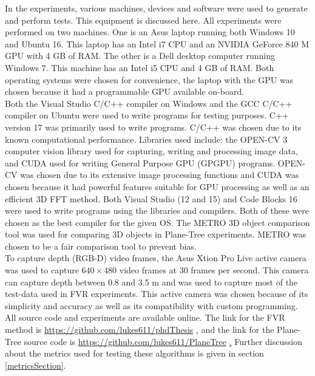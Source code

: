 
In the experiments, various machines, devices and software were used to generate and perform tests. This equipment is discussed here. All experiments were performed on two machines. One is an Asus laptop running both Windows 10 and Ubuntu 16. This laptop has an Intel i7 CPU and an NVIDIA GeForce 840 M GPU with 4 GB of RAM. The other is a Dell desktop computer running Windows 7. This machine has an Intel i5 CPU and 4 GB of RAM. Both operating systems were chosen for convenience, the laptop with the GPU was chosen because it had a programmable GPU available on-board. \\ 

Both the Visual Studio C/C++ compiler on Windows and the GCC C/C++ compiler on Ubuntu were used to write programs for testing purposes. C++ version 17 was primarily used to write programs. C/C++ was chosen due to its known computational performance. Libraries used include: the OPEN-CV 3 computer vision library used for capturing, writing and processing image data, and CUDA used for writing General Purpose GPU (GPGPU) programs. OPEN-CV was chosen due to its extensive image processing functions and CUDA was chosen because it had powerful features suitable for GPU processing as well as an efficient 3D FFT method. Both Visual Studio (12 and 15) and Code Blocks 16 were used to write programs using the libraries and compilers. Both of these were chosen as the best compiler for the given OS. The METRO 3D object comparison tool was used for comparing 3D objects in Plane-Tree experiments. METRO was chosen to be a fair comparison tool to prevent bias. \\

To capture depth (RGB-D) video frames, the Asus Xtion Pro Live active camera was used to capture $640\times480$ video frames at 30 frames per second. This camera can capture depth between 0.8 and 3.5 m and was used to capture most of the test-data used in FVR experiments. This active camera was chosen because of its simplicity and accuracy as well as its compatibility with custom programming. \\ 

All source code and experiments are available online. The link for the FVR method is \url{https://github.com/lukes611/phdThesis} \href{https://github.com/lukes611/phdThesis}, and the link for the Plane-Tree source code is \url{https://github.com/lukes611/PlaneTree} \href{https://github.com/lukes611/PlaneTree}. Further discussion about the metrics used for testing these algorithms is given in section \ref{metricsSection}. \\  

